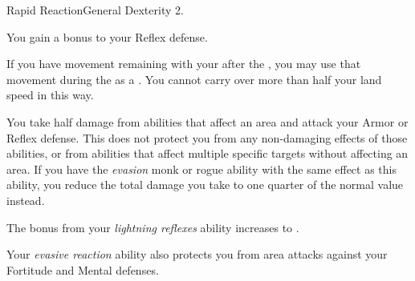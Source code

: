     \begin{feat}{Rapid Reaction}{General}
        \featpre Dexterity 2.

         You gain a  bonus to your Reflex defense.

         If you have movement remaining with your  after the , you may use that movement during the  as a .
        You cannot carry over more than half your land speed in this way.

         You take half damage from abilities that affect an area and attack your Armor or Reflex defense.
        This does not protect you from any non-damaging effects of those abilities, or from abilities that affect multiple specific targets without affecting an area.
        If you have the \textit{evasion} monk or rogue ability with the same effect as this ability, you reduce the total damage you take to one quarter of the normal value instead.

         The bonus from your \textit{lightning reflexes} ability increases to .

         Your \textit{evasive reaction} ability also protects you from area attacks against your Fortitude and Mental defenses.
    \end{feat}

